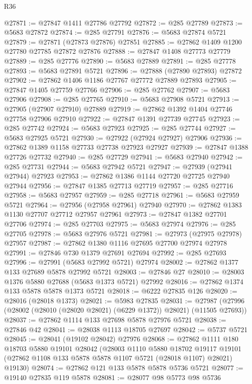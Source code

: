 \begin{lexlean}{R36}
\begin{coremodule}
@27871 := @27847 @1411 @27786 @27792
@27872 := @285 @27789
@27873 := @5683 @27872
@27874 := @285 @27791
@27876 := @5683 @27874 @5721
@27879 := @27871 (@27873 @27876) @27851
@27885 := @27862 @1409 @1200 @27780 @27785 @27872 @27876
@27888 := @27847 @1408 @27773 @27779
@27889 := @285 @27776
@27890 := @5683 @27889
@27891 := @285 @27778
@27893 := @5683 @27891 @5721
@27896 := @27888 (@27890 @27893) @27872
@27902 := @27862 @1406 @1186 @27767 @27772 @27889 @27893
@27905 := @27847 @1405 @27759 @27766
@27906 := @285 @27762
@27907 := @5683 @27906
@27908 := @285 @27765
@27910 := @5683 @27908 @5721
@27913 := @27905 (@27907 @27910) @27889
@27919 := @27862 @1392 @1404 @27746 @27758 @27906 @27910
@27922 := @27847 @1391 @27739 @27745
@27923 := @285 @27742
@27924 := @5683 @27923
@27925 := @285 @27744
@27927 := @5683 @27925 @5721
@27930 := @27922 (@27924 @27927) @27906
@27936 := @27862 @1389 @1158 @27733 @27738 @27923 @27927
@27939 := @27847 @1388 @27726 @27732
@27940 := @285 @27729
@27941 := @5683 @27940
@27942 := @285 @27731
@27944 := @5683 @27942 @5721
@27947 := @27939 (@27941 @27944) @27923
@27953 := @27862 @1386 @1144 @27720 @27725 @27940 @27944
@27956 := @27847 @1385 @27713 @27719
@27957 := @285 @27716
@27958 := @5683 @27957
@27959 := @285 @27718
@27961 := @5683 @27959 @5721
@27964 := @27956 (@27958 @27961) @27940
@27970 := @27862 @1383 @1130 @27707 @27712 @27957 @27961
@27973 := @27847 @1382 @27701 @27706
@27974 := @285 @27703
@27975 := @5683 @27974
@27976 := @285 @27705
@27978 := @5683 @27976 @5721
@27981 := @27973 (@27975 @27978) @27957
@27987 := @27862 @1380 @1116 @27695 @27700 @27974 @27978
@27991 := @27846 @730 @1379 @27691 @27694
@27992 := @285 @27693
@27996 := @27991 (@5683 @27992 @5721) @27974
@28002 := @27862 @1377 @133 @27689 @5878 @27992 @5721
@28003 := @27846 @27
@28010 := @28003 @1376 @5880 @27688 (@5683 @1373 @5721) @27992
@28016 := @27862 @1374 @133 @5878 @5878 @1373 @5721
@28018 := @6222 @27835 @126
@28020 := @28016 (@28018 @1373)
@28021 := @5983 @27835
@28031 := @27987 (@27996 (@28002 (@28010 (@28020 @28021) (@6229 @1372)) @28021) (@11505 @27693))
@28037 := @27862 @1114 @133 @27698 @5878 @27976 @5721
@28038 := @27846 @42
@28041 := @28038 @1113 @18705 @27697
@28042 := @5737 @5721
@28045 := @28041 (@19102 @28042) @27976
@28068 := @27862
    @1111
    @180
    @18703
    @5880
    @19101
    @28042
    (@28003
      @1110
      @5880
      @18702
      @19117
      @19101
      (@27862 @1108 @133 @5878 @5878 @1107 @5721 (@28018 @1107) @28021)
      @19130)
@28074 := @27862 @121 @133 @5878 @5878 @5736 @5721
@28077 := @19140 @27835 @119 @5878
@28081 := @28077 @98 @5773 @98 @5736

\end{coremodule}
\end{lexlean}
